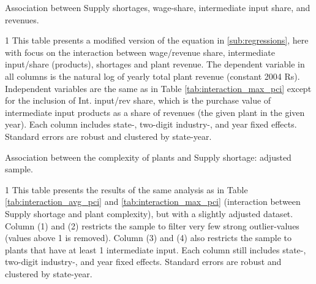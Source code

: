 \documentclass[11pt]{article}
\begin{document}
\begin{table}[H]
	\begin{center}
		\begin{threeparttable}
		\caption{Association between Supply shortages, wage-share, intermediate input share, and revenues.}
			\label{tab:interaction_wage_input}
			
			\begin{tablenotes} \footnotesize
			\item[1] This table presents a modified version of the equation in \ref{sub:regressions}, here with focus on the interaction between wage/revenue share, intermediate input/share (products), shortages and plant revenue. The dependent variable in all columns is the natural log of yearly total plant revenue (constant 2004 Rs). Independent variables are the same as in Table \ref{tab:interaction_max_pci} except for the inclusion of Int. input/rev share, which is the purchase value of intermediate input products as a share of revenues (the given plant in the given year). Each column includes state-, two-digit industry-, and year fixed effects. Standard errors are robust and clustered by state-year.
			\end{tablenotes}
		\end{threeparttable}
	\end{center}
\end{table}

\begin{table}[H] 
	\begin{center}
		\begin{threeparttable}
			\caption{Association between the complexity of plants and Supply shortage: adjusted sample.}
			\label{tab:filtered_input}
			
			\begin{tablenotes} \footnotesize 
			\item[1] This table presents the results of the same analysis as in Table \ref{tab:interaction_avg_pci} and \ref{tab:interaction_max_pci} (interaction between Supply shortage and plant complexity), but with a slightly adjusted dataset. Column (1) and (2) restricts the sample to filter very few strong outlier-values (values above 1 is removed). Column (3) and (4) also restricts the sample to plants that have at least 1 intermediate input. Each column still includes state-, two-digit industry-, and year fixed effects. Standard errors are robust and clustered by state-year.
			\end{tablenotes}
		\end{threeparttable}
	\end{center}
\end{table}   
\end{document}
